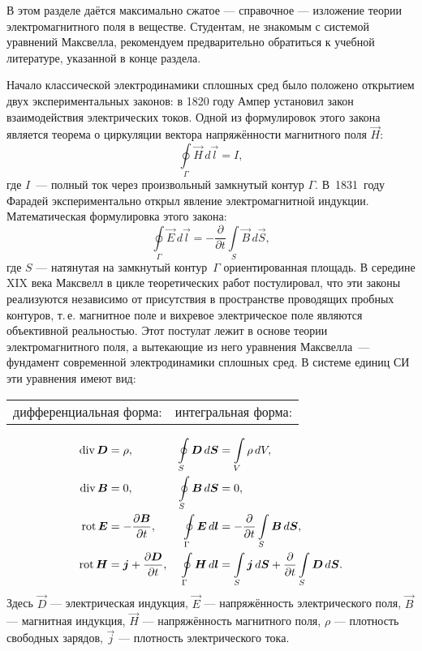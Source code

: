 \newcommand*{\ddt}[1]{\frac{\partial #1}{\partial t}}

В этом разделе даётся максимально сжатое --- справочное --- 
изложение теории электромагнитного поля в веществе. Студентам, 
не знакомым с системой уравнений Максвелла, рекомендуем предварительно
обратиться к учебной литературе, указанной в конце раздела.


Начало классической электродинамики сплошных сред было положено открытием двух
экспериментальных законов: в 1820 году Ампер установил закон взаимодействия 
электрических токов. Одной из формулировок этого закона является теорема 
о циркуляции вектора напряжённости магнитного поля $\vec{H}$:
\[
\oint\limits_{\Gamma}\vec{H}\,d\vec{l}=I,
\]
где $I$~--- полный ток через произвольный замкнутый контур $\Gamma$. В~1831~году Фарадей 
экспериментально открыл явление электромагнитной индукции. Математическая формулировка
этого закона:
\[
\oint\limits_{\Gamma}\vec{E}\,d\vec{l}=- \frac{\partial}{\partial t} \int\limits_S \vec{B}\, d\vec{S},
\]
где $S$ --- натянутая на замкнутый контур~$\Gamma$ ориентированная площадь.
В середине XIX века Максвелл в цикле теоретических работ постулировал, 
что эти законы реализуются независимо 
от присутствия в пространстве проводящих пробных контуров, т.\,е. магнитное поле 
и вихревое электрическое поле являются объективной реальностью. 
Этот постулат лежит в основе теории электромагнитного поля, а вытекающие 
из него уравнения Максвелла~--- фундамент современной электродинамики сплошных сред. 
В системе единиц СИ эти уравнения имеют вид:\par
\noindent\begin{tabular}{p{4.3cm}p{5cm}}
\small дифференциальная форма: & \small интегральная форма:
\end{tabular}
\begin{align}
\Div \vec{D} &= \rho,         & 
    \oint\limits_S \vec{D}\,d\vec{S} &= \int\limits_V\rho\, dV, \eqmark{1} \\
\Div \vec{B} &= 0,            & 
    \oint\limits_S \vec{B}\,d\vec{S} &= 0, \eqmark{2} \\
\Rot \vec{E} &= -\ddt{\vec{B}}, & 
    \oint\limits_{\Gamma} \vec{E}\,d\vec{l} & = 
           - \frac{\partial}{\partial t} \int\limits_S \vec{B}\, d\vec{S}, \eqmark{3}\\
\Rot \vec{H} &= \vec{j} + \ddt{\vec{D}}, & 
    \oint\limits_{\Gamma} \vec{H}\,d\vec{l} &= \int\limits_S \vec{j}\,d\vec{S} + 
                  \frac{\partial}{\partial t} \int\limits_S \vec{D}\, d\vec{S}. \eqmark{4}
\end{align}
Здесь $\vec{D}$ --- электрическая индукция, 
$\vec{E}$ --- напряжённость электрического поля, 
$\vec{B}$ --- магнитная индукция, $\vec{H}$ --- напряжённость магнитного поля,
$\rho$ --- плотность свободных зарядов, $\vec{j}$ --- плотность электрического тока.

